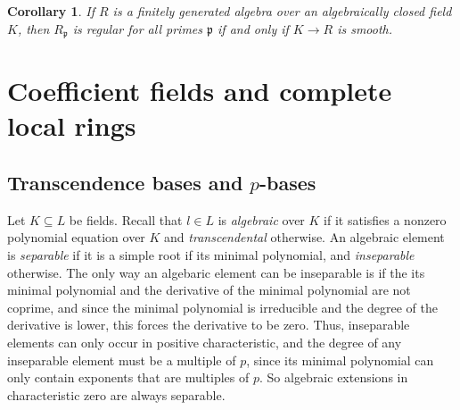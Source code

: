 \documentclass{amsart}[12pt]
\newcommand{\fp}{{\mathfrak p}}
\numberwithin{equation}{section}
\theoremstyle{plain} %
\newtheorem{cor}[equation]{Corollary}
\theoremstyle{definition}
\theoremstyle{remark}
\begin{document}
\begin{cor} If $R$ is a finitely generated algebra over an algebraically closed field $K$, then $R_\fp$ is regular for all primes $\fp$ if and only if $K\to R$ is smooth.
\end{cor}

\section{Coefficient fields and complete local rings}

\subsection{Transcendence bases and $p$-bases}

Let $K\subseteq L$ be fields. Recall that $l\in L$ is \emph{algebraic} over $K$ if it satisfies a nonzero polynomial equation over $K$ and \emph{transcendental} otherwise. An algebraic element is \emph{separable} if it is a simple root if its minimal polynomial, and \emph{inseparable} otherwise. The only way an algebaric element can be inseparable is if the  its minimal polynomial and the derivative of the minimal polynomial are not coprime, and since the minimal polynomial is irreducible and the degree of the derivative is lower, this forces the derivative to be zero. Thus, inseparable elements can only occur in positive characteristic, and the degree of any inseparable element must be a multiple of $p$, since its minimal polynomial can only contain exponents that are multiples of $p$. So algebraic extensions in characteristic zero are always separable.
\end{document}
